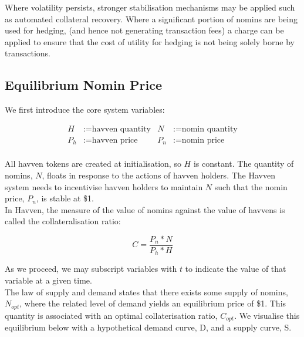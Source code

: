 \noindent Where volatility persists, stronger stabilisation mechanisms may be applied such as automated collateral recovery. Where a significant portion of nomins are being used for hedging, (and hence not generating transaction fees) a charge can be applied to ensure that the cost of utility for hedging is not being solely borne by transactions.

\newpage

\subsection{Equilibrium Nomin Price}

\noindent We first introduce the core system variables:

\begin{align*}
H &:= \text{havven quantity} & N &:= \text{nomin quantity} \\
P_h &:= \text{havven price}  & P_n &:= \text{nomin price} \\
\end{align*}


\noindent All havven tokens are created at initialisation, so $H$ is constant.
The quantity of nomins, $N$, floats in response to the actions of havven holders.
The Havven system needs to incentivise havven holders to maintain $N$ such that
the nomin price, $P_n$, is stable at \$1.\\

\noindent In Havven, the measure of the value of nomins against the value
of havvens is called the collateralisation ratio:

\begin{equation}
C = \frac{P_n * N}{P_h * H} \label{eq:collateralisation}
\end{equation}

\noindent As we proceed, we may subscript variables with $t$ to indicate the value of that
variable at a given time. \\

\noindent The law of supply and demand states that there exists some supply
of nomins, $N_{opt}$, where the related level of demand yields an equilibrium
price of \$1. This quantity is associated with an optimal collaterisation ratio,
$C_{opt}$. We visualise this equilibrium below with a hypothetical demand
curve, D, and a supply curve, S.  \\

